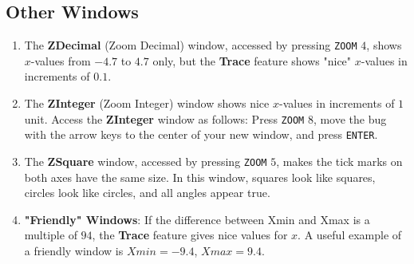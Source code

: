 \documentclass[10pt,]{book}
\newcommand{\terminology}[1]{\textbf{#1}}
\theoremstyle{plain}
\theoremstyle{definition}
\theoremstyle{definition}
\theoremstyle{definition}
\numberwithin{equation}{part}
\begin{document}
\subsection[{Other Windows}]{Other Windows}\label{subsection-81}
\leavevmode%
\begin{enumerate}[label=*\arabic**]
\item\hypertarget{li-422}{}The \terminology{ZDecimal} (Zoom Decimal) window, accessed by pressing \lstinline?ZOOM? \(4\), shows \(x\)-values from \(-4.7\) to \(4.7\) only, but the \terminology{Trace} feature shows "nice" \(x\)-values in increments of \(0.1\).%
\item\hypertarget{li-423}{}The \terminology{ZInteger} (Zoom Integer) window shows nice \(x\)-values in increments of \(1\) unit. Access the \terminology{ZInteger} window as follows: Press \lstinline?ZOOM? \(8\), move the bug with the arrow keys to the center of your new window, and press \lstinline?ENTER?.%
\item\hypertarget{li-424}{}The \terminology{ZSquare} window, accessed by pressing \lstinline?ZOOM? \(5\), makes the tick marks on both axes have the same size. In this window, squares look like squares, circles look like circles, and all angles appear true.%
\item\hypertarget{li-425}{}\terminology{"Friendly" Windows}: If the difference between Xmin and Xmax is a multiple of \(94\), the \terminology{Trace} feature gives nice values for \(x\). A useful example of a friendly window is \(Xmin=-9.4\), \(Xmax= 9.4\).%
\end{enumerate}
%
\typeout{************************************************}
\typeout{************************************************}
\end{document}
